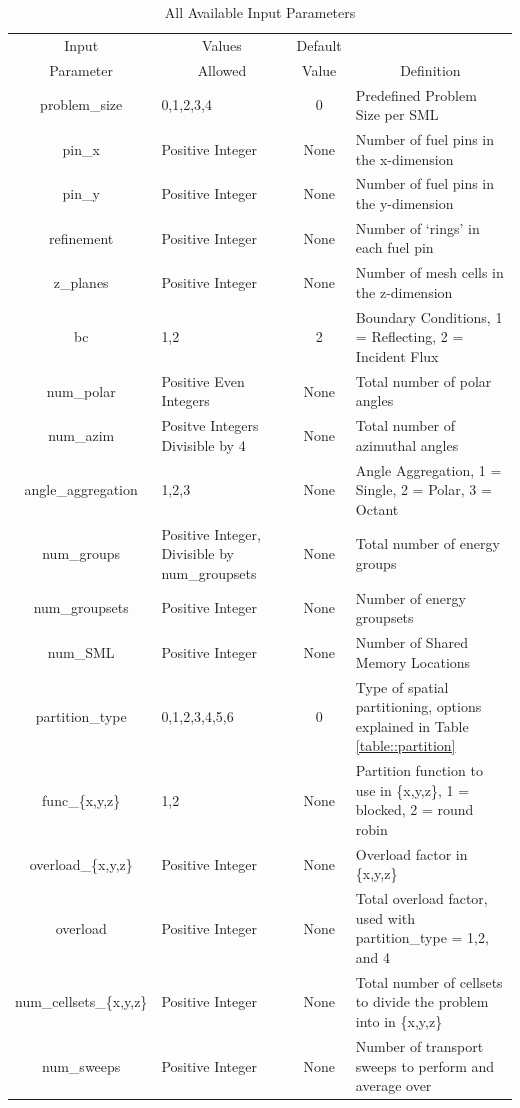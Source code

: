 \documentclass{article}
\begin{document}
\begin{table}[h!]
\begin{center}
  \begin{tabular}{ |c|p{5cm}|c|p{6.4cm}|}
    \hline
    Input &\multicolumn{1}{c|}{ Values} &  Default& \\ 
    Parameter & \multicolumn{1}{c|}{Allowed}&Value& \multicolumn{1}{c|}{Definition}\\
    \hline
    problem\_size & 0,1,2,3,4 & 0& Predefined Problem Size per SML\\  \hline
    pin\_x& Positive Integer & None &  Number of fuel pins in the x-dimension\\ 
    pin\_y& Positive Integer & None &  Number of fuel pins in the y-dimension\\
    refinement & Positive Integer & None & Number of `rings' in each fuel pin \\
    z\_planes& Positive Integer & None &  Number of mesh cells in the z-dimension\\ 
    bc & 1,2 & 2 & Boundary Conditions, 1 = Reflecting, 2 = Incident Flux \\ \hline
    num\_polar & Positive Even Integers& None &  Total number of polar angles \\
    num\_azim & Positve Integers Divisible by 4&  None& Total number of azimuthal angles \\
    angle\_aggregation & 1,2,3 & None & Angle Aggregation, 1 = Single, 2 = Polar, 3 = Octant \\ \hline
    num\_groups & Positive Integer, Divisible by num\_groupsets & None & Total number of energy groups \\ 
    num\_groupsets & Positive Integer & None & Number of energy groupsets \\ \hline
    num\_SML & Positive Integer & None & Number of Shared Memory Locations \\
    partition\_type & 0,1,2,3,4,5,6 & 0 & Type of spatial partitioning, options explained in Table \ref{table::partition} \\
    func\_\{x,y,z\} & 1,2 & None & Partition function to use in \{x,y,z\}, 1 = blocked, 2 = round robin \\
    overload\_\{x,y,z\} & Positive Integer & None & Overload factor in \{x,y,z\} \\
    overload & Positive Integer & None & Total overload factor, used with partition\_type = 1,2, and 4 \\
    num\_cellsets\_\{x,y,z\} & Positive Integer & None & Total number of cellsets to divide the problem into in \{x,y,z\} \\ 
    num\_sweeps & Positive Integer & None & Number of transport sweeps to perform and average over \\
    \hline
  \end{tabular} 
      \caption{All Available Input Parameters}
      \label{table::parameters}
\end{center}
\end{table}
\end{document}
